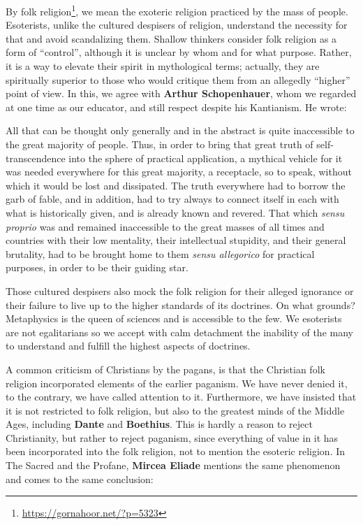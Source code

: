 By folk religion\footnote{\url{https://gornahoor.net/?p=5323}}, we mean the exoteric religion practiced by the mass of people. Esoterists, unlike the cultured despisers of religion, understand the necessity for that and avoid scandalizing them. Shallow thinkers consider folk religion as a form of ``control'', although it is unclear by whom and for what purpose. Rather, it is a way to elevate their spirit in mythological terms; actually, they are spiritually superior to those who would critique them from an allegedly ``higher'' point of view. In this, we agree with \textbf{Arthur Schopenhauer}, whom we regarded at one time as our educator, and still respect despite his Kantianism. He wrote:

\begin{quotex}
All that can be thought only generally and in the abstract is quite inaccessible to the great majority of people. Thus, in order to bring that great truth of self-transcendence into the sphere of practical application, a mythical vehicle for it was needed everywhere for this great majority, a receptacle, so to speak, without which it would be lost and dissipated. The truth everywhere had to borrow the garb of fable, and in addition, had to try always to connect itself in each with what is historically given, and is already known and revered. That which \emph{sensu proprio} was and remained inaccessible to the great masses of all times and countries with their low mentality, their intellectual stupidity, and their general brutality, had to be brought home to them \emph{sensu allegorico} for practical purposes, in order to be their guiding star.
\end{quotex}


Those cultured despisers also mock the folk religion for their alleged ignorance or their failure to live up to the higher standards of its doctrines. On what grounds? Metaphysics is the queen of sciences and is accessible to the few. We esoterists are not egalitarians so we accept with calm detachment the inability of the many to understand and fulfill the highest aspects of doctrines.

A common criticism of Christians by the pagans, is that the Christian folk religion incorporated elements of the earlier paganism. We have never denied it, to the contrary, we have called attention to it. Furthermore, we have insisted that it is not restricted to folk religion, but also to the greatest minds of the Middle Ages, including \textbf{Dante} and \textbf{Boethius}. This is hardly a reason to reject Christianity, but rather to reject paganism, since everything of value in it has been incorporated into the folk religion, not to mention the esoteric religion. In The Sacred and the Profane, \textbf{Mircea Eliade} mentions the same phenomenon and comes to the same conclusion:

